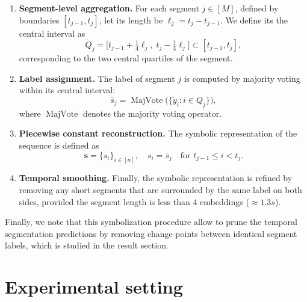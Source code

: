         \begin{enumerate}
            \item \textbf{Segment-level aggregation.}
            For each segment $j \in [M]$, defined by boundaries $[t_{j-1}, t_j]$, let its length be $\ell_j = t_j - t_{j-1}$.
            We define its the central interval as
            \[
                Q_j = 
                \big[
                    t_{j-1} + \tfrac{1}{4}\ell_j,\;
                    t_j - \tfrac{1}{4}\ell_j
                \big]
                \subset [t_{j-1}, t_j],
            \]
            corresponding to the two central quartiles of the segment.

            \item \textbf{Label assignment.}
            The label of segment $j$ is computed by majority voting within 
            its central interval:
            \[
                \bar{s}_j = 
                \operatorname{MajVote}\big(
                    \{\tilde{y}_i : i \in Q_j\}
                \big),
            \]
            where $\operatorname{MajVote}$ denotes the majority voting operator.

            \item \textbf{Piecewise constant reconstruction.}
            The symbolic representation of the sequence is defined as
            \[
                \mathbf{s} = \{s_i\}_{i \in [n]},
                \quad 
                s_i = \bar{s}_j
                \quad \text{for } 
                t_{j-1} \le i < t_j.
            \]

            \item \textbf{Temporal smoothing.}
            Finally, the symbolic representation is refined by removing any short segments that are surrounded by the same label on both sides, provided the segment length is less than 4 embeddings ($\approx 1.3s$).
        \end{enumerate}

        Finally, we note that this symbolization procedure allow to prune the temporal segmentation predictions by removing change-points between identical segment labels, which is studied in the result section.
        




\section{Experimental setting}
\label{sec:experimental_setting}


